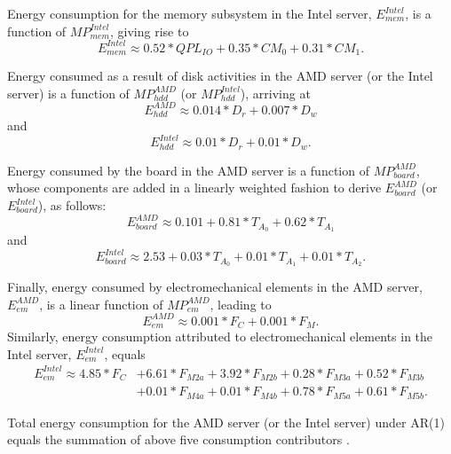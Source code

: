 Energy consumption for the memory subsystem in the Intel server,
$E_{mem}^{Intel}$, is a function of $MP_{mem}^{Intel}$, giving rise to
\begin{equation*}
  E_{mem}^{Intel} \approx 0.52*QPL_{IO}+0.35*CM_{0}+0.31*CM_{1}. 
\end{equation*}

Energy consumed as a result of disk activities in the AMD server (or the
Intel server) is a function of $MP_{hdd}^{AMD}$ (or $MP_{hdd}^{Intel}$),
arriving at 
\begin{equation*}
E_{hdd}^{AMD} \approx 0.014*D_{r}+0.007*D_{w}
\end{equation*}
and
\begin{equation*}
E_{hdd}^{Intel} \approx 0.01*D_{r}+0.01*D_{w}.
\end{equation*}

Energy consumed by the board in the AMD server is a function of $MP_{board}^{AMD}$,
whose components are added in a linearly weighted fashion to derive
$E_{board}^{AMD}$ (or $E_{board}^{Intel}$), as follows:
\begin{equation*}
E_{board}^{AMD} \approx 0.101+0.81*T_{A_{0}}+0.62*T_{A_{1}}
\end{equation*}
and
\begin{equation*}
E_{board}^{Intel} \approx 2.53+0.03*T_{A_{0}}+0.01*T_{A_{1}}+0.01*T_{A_{2}}.
\end{equation*}

Finally, energy consumed by electromechanical elements in the AMD server, $E_{em}^{AMD}$,
is a linear function of $MP_{em}^{AMD}$, leading to
\begin{equation*}
E_{em}^{AMD} \approx 0.001*F_{C}+0.001*F_{M}.
\end{equation*}
Similarly, energy consumption attributed to electromechanical elements in the Intel server, $E_{em}^{Intel}$, equals
\begin{align*}
E_{em}^{Intel}\approx4.85*F_{C}&+6.61*F_{M2a}+3.92*F_{M2b}+0.28*F_{M3a}+0.52*F_{M3b}\\
            &+0.01*F_{M4a}+0.01*F_{M4b}+0.78*F_{M5a}+0.61*F_{M5b}.
\end{align*}

Total energy consumption for the AMD server (or the Intel server)
under AR(1) equals the summation of above five consumption contributors
\cite{Lewis2008}.

